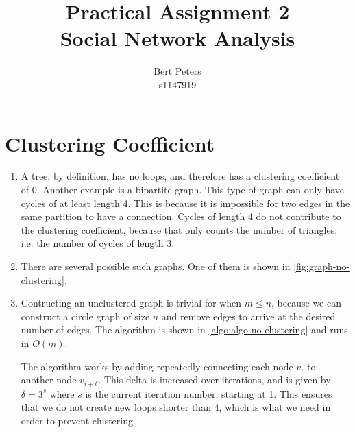 \documentclass[a4paper,10pt,hidelinks]{article}
\title{Practical Assignment 2\\
Social Network Analysis}
\author{Bert Peters\\
s1147919}
\begin{document}
\maketitle

\section{Clustering Coefficient}

\begin{enumerate}
 \item A tree, by definition, has no loops, and therefore has a clustering coefficient of 0. Another example is a bipartite graph. This type of graph can only have cycles of at least length 4. This is because it is impossible for two edges in the same partition to have a connection. Cycles of length 4 do not contribute to the clustering coefficient, because that only counts the number of triangles, i.e. the number of cycles of length 3.

 \item There are several possible such graphs. One of them is shown in \autoref{fig:graph-no-clustering}.
 
 \item Contructing an unclustered graph is trivial for when $m \leq n$, because we can construct a circle graph of size $n$ and remove edges to arrive at the desired number of edges. The algorithm is shown in \autoref{algo:algo-no-clustering} and runs in $O(m)$.
 
The algorithm works by adding repeatedly connecting each node $v_i$ to another node $v_{i + \delta}$. This delta is increased over iterations, and is given by $\delta = 3^s$ where $s$ is the current iteration number, starting at 1. This ensures that we do not create new loops shorter than 4, which is what we need in order to prevent clustering.
\end{enumerate}
\end{document}
